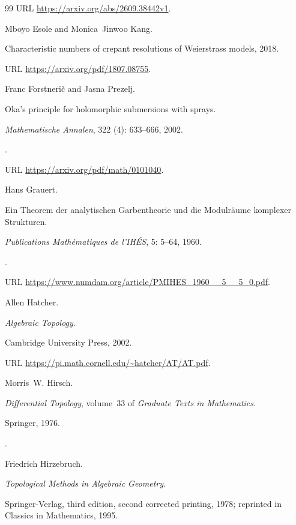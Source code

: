 \documentclass[11pt,a4paper]{article}
\numberwithin{equation}{section}
\theoremstyle{definition}
\begin{document}
\begin{thebibliography}{99}
\newblock URL \url{https://arxiv.org/abs/2609.38442v1}.

Mboyo Esole and Monica~Jinwoo Kang.

\newblock Characteristic numbers of crepant resolutions of Weierstrass models,
  2018.

\newblock URL \url{https://arxiv.org/pdf/1807.08755}.

Franc Forstneri{\v c} and Jasna Prezelj.

\newblock Oka's principle for holomorphic submersions with sprays.

\newblock \emph{Mathematische Annalen}, 322 (4): 633--666,
  2002.

\newblock {}.

\newblock URL \url{https://arxiv.org/pdf/math/0101040}.

Hans Grauert.

\newblock Ein Theorem der analytischen Garbentheorie und die Modulräume komplexer Strukturen.

\newblock \emph{Publications Mathématiques de l'IHÉS}, 5: 5--64,
  1960.

\newblock {}.

\newblock URL \url{https://www.numdam.org/article/PMIHES_1960__5__5_0.pdf}.

Allen Hatcher.

\newblock \emph{Algebraic Topology}.

\newblock Cambridge University Press, 2002.

\newblock URL \url{https://pi.math.cornell.edu/~hatcher/AT/AT.pdf}.

Morris~W. Hirsch.

\newblock \emph{Differential Topology}, volume~33 of \emph{Graduate Texts in
  Mathematics}.

\newblock Springer, 1976.

\newblock {}.

Friedrich Hirzebruch.

\newblock \emph{Topological Methods in Algebraic Geometry}.

\newblock Springer-Verlag, third edition, second corrected printing, 1978; reprinted in Classics in Mathematics, 1995.


\end{thebibliography}
\end{document}
